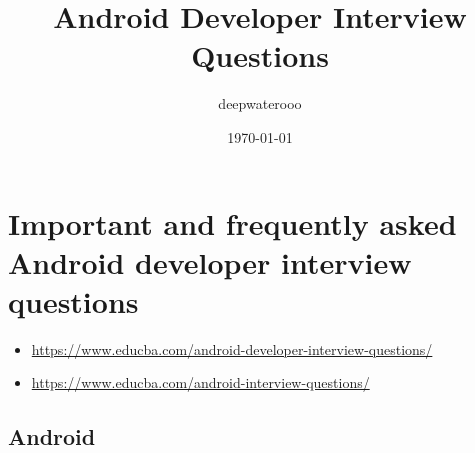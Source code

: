\documentclass[9pt, b5paper]{article}
\author{deepwaterooo}
\date{\today}
\title{Android Developer Interview Questions}
\begin{document}
\maketitle
\tableofcontents


\section{Important and frequently asked Android developer interview questions}
\label{sec-1}
\begin{itemize}
\item \url{https://www.educba.com/android-developer-interview-questions/}
\item \url{https://www.educba.com/android-interview-questions/}
\end{itemize}
\subsection{Android}
\label{sec-1-1}
\end{document}
